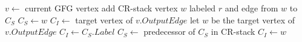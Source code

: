\begin{algorithmic}
	
	\State $v \gets$ current GFG vertex
					\State {}
				\EndFor
			\EndCase
				\State add CR-stack vertex $w$ labeled $r$ and edge from $w$ to $C_S$
				\State $C_S \gets w$
				\State $C_I \gets$ target vertex of $v.OutputEdge$
				\State {}
			\EndCase
				\State let $w$ be the target vertex of $v.OutputEdge$
					\State $C_I \gets C_S.Label$
					\State $C_S \gets$ predecessor of $C_S$ in CR-stack
					\State {}
				\Else
					\State $C_I \gets w$
				\EndIf
			\EndCase
			\Case{\_}
				\State \Return
			\EndCase
		\EndSwitch
	\EndIf
\EndProcedure
\end{algorithmic}